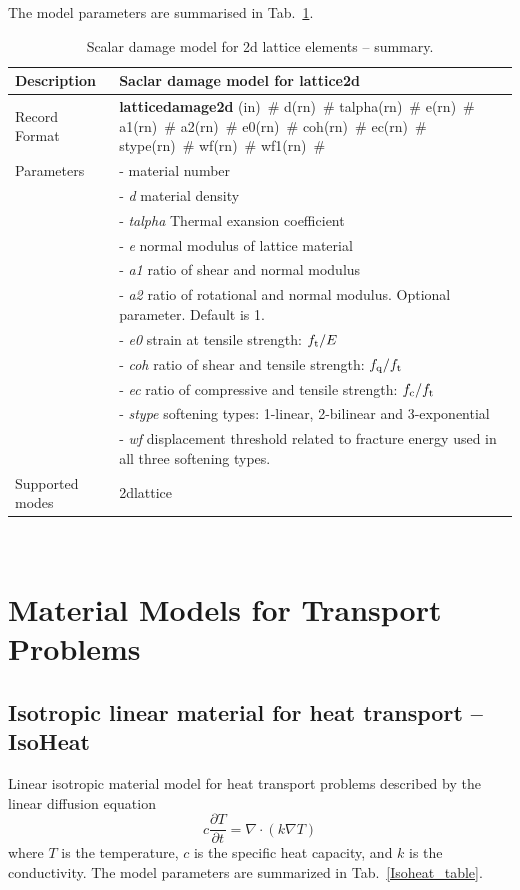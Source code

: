 \documentclass[a4paper]{article}
\newcommand{\descitem}[1]{{\noindent \bf #1}}
\newcommand{\elemparam}[2]{{{#1\tiny (#2)}~\#}}
\newcommand{\param}[1]{{\it #1}}
\newenvironment{mmt}{\begin{tabular}{|l|p{9cm}|}}{\end{tabular}\\}
\newenvironment{mmt}{\begin{tabular}{|l|l|}}{\end{tabular}\\}
\begin{document}
The model parameters are summarised in Tab.~\ref{latticedamage2d_table}.
\begin{table}[!htb]
\begin{mmt}
\hline
Description & Saclar damage model for lattice2d \\
\hline
Record Format & \descitem{latticedamage2d} \elemparam{}{in} 
\elemparam{d}{rn} \elemparam{talpha}{rn} \elemparam{e}{rn} \elemparam{a1}{rn} \elemparam{a2}{rn} \elemparam{e0}{rn}  \elemparam{coh}{rn} \elemparam{ec}{rn} \elemparam{stype}{rn} \elemparam{wf}{rn} \elemparam{wf1}{rn} \\
Parameters &- \param{} material number\\
&- \param{d} material density\\
&- \param{talpha} Thermal exansion coefficient\\
&- \param{e} normal modulus of lattice material\\
&- \param{a1} ratio of shear and normal modulus\\
&- \param{a2} ratio of rotational and normal modulus. Optional parameter. Default is 1.\\
&- \param{e0} strain at tensile strength: $f_{\rm t}/E$\\
&- \param{coh} ratio of shear and tensile strength: $f_{\rm q}/f_{\rm t}$\\
&- \param{ec} ratio of compressive and tensile strength: $f_{\rm c}/f_{\rm t}$\\
&- \param{stype} softening types: 1-linear, 2-bilinear and 3-exponential\\
&- \param{wf} displacement threshold related to fracture energy used in all three softening types.\\

Supported modes& 2dlattice\\
\hline
\end{mmt}
\caption{Scalar damage model for 2d lattice elements -- summary.}
\label{latticedamage2d_table}
\end{table}

\clearpage

\section{Material Models for Transport Problems}
\subsection{Isotropic linear material for heat transport -- IsoHeat}
\label{IsoLET}
Linear isotropic material model for heat transport problems described
by the linear diffusion equation
\begin{equation}\label{lindiffheat}
c\frac{\partial T}{\partial t} = \nabla \cdot \left( k \nabla T \right)
\end{equation}
where $T$ is the temperature, $c$ is the specific heat capacity,
and $k$ is the conductivity.
The model parameters are summarized
in Tab.~\ref{Isoheat_table}.
\end{document}
